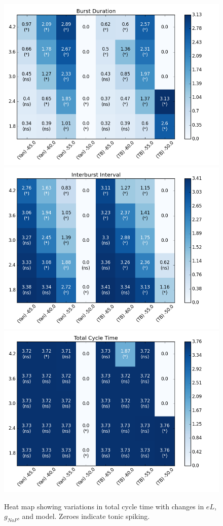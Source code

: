 \documentclass[11pt]{article}
\begin{document}
\begin{figure}
	\centering
	\includegraphics[scale=.4]{heatmap_Burst_Duration.png}
	\includegraphics[scale=.4]{heatmap_Interburst_Interval.png}
	\includegraphics[scale=0.4]{heatmap_Total_Cycle_Time.png}
	\caption{Heat map showing variations in total cycle time with changes in $eL$, $g_{NaP}$, and model. Zeroes indicate tonic spiking.}
	\label{fig:hmTCT}
\end{figure}
\end{document}
